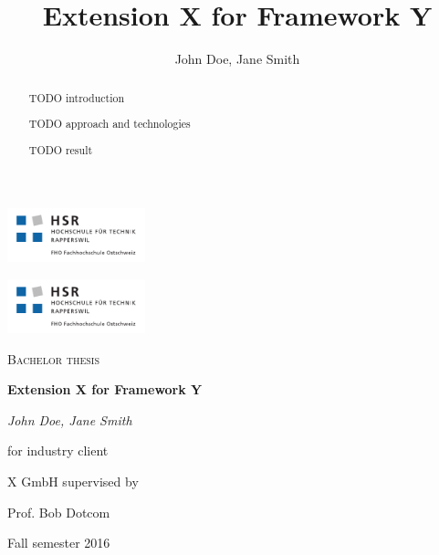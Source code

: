 \documentclass[a4paper]{report}
\title{Extension X for Framework Y}
\author{John Doe, Jane Smith}
\begin{document}

\thispagestyle{empty}

\begin{titlepage}
\centering
\begin{raggedleft}\includegraphics[trim=10 10 10 8, clip=true, width=0.3\textwidth]{img/hsr_logo.pdf}\end{raggedleft}
\begin{raggedright}\hfill\includegraphics[trim=10 10 10 8, clip=true, width=0.3\textwidth]{img/hsr_logo.pdf}\end{raggedright} %

\par\vspace{30mm}
{\scshape\Large Bachelor thesis\par}
\vspace{1.5cm}
{\huge\bfseries Extension X for Framework Y\par}
\vspace{2cm}
{\Large\itshape John Doe, Jane Smith\par}
\vfill
for industry client\par
X GmbH
\vfill
supervised by\par
Prof. Bob Dotcom

\vfill

{\large Fall semester 2016\par}
\end{titlepage}

\begin{abstract}

TODO introduction

TODO approach and technologies

TODO result

\end{abstract}
\end{document}
